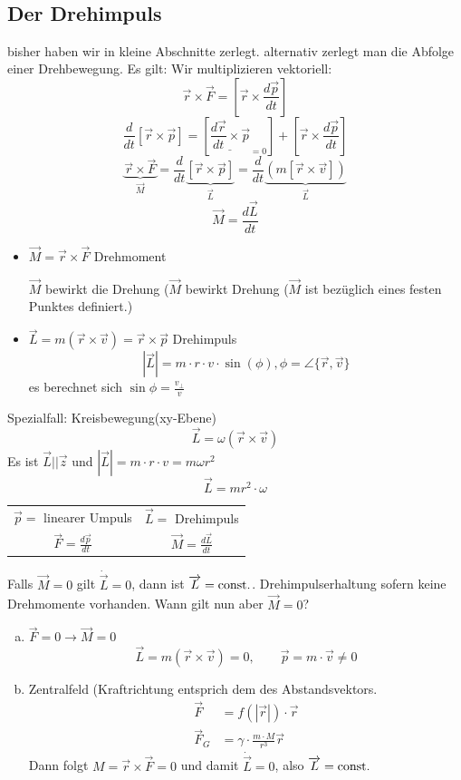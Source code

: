 \documentclass[a4paper,10pt]{scrartcl}
\begin{document}
\\
\subsection{Der Drehimpuls}
bisher haben wir in kleine Abschnitte zerlegt.
alternativ zerlegt man die Abfolge einer Drehbewegung. Es gilt:
Wir multiplizieren vektoriell:
\[
 \vec r \times \vec F=[\vec r \times \frac{d\vec p}{dt}]
\]
\[
 \frac{d}{dt}[\vec r \times \vec p]=[\underline{\frac{d\vec r}{dt} \times \vec p}_{=0}]+[\vec r \times \frac{d\vec p}{dt}]
\]
\[
 \underbrace{\vec r\times \vec F}_{\vec M}= \frac{d}{dt}\underbrace{[\vec r \times \vec p]}_{\vec L}=\frac{d}{dt}\underbrace{(m[\vec r \times \vec v])}_{\vec L}
\]
\[
 \boxed{\vec M= \frac{d\vec L}{dt}}
\]
\begin{itemize}
 \item $\vec M=\vec r \times \vec F$ Drehmoment
\begin{ex*}
$\vec M$ bewirkt die Drehung ($\vec M$ bewirkt Drehung ($\vec M$ ist bezüglich eines festen Punktes definiert.)  
\end{ex*}
\item $\vec L=m(\vec r \times \vec v)=\vec r \times \vec p$ Drehimpuls
\[
 |\vec L|=m\cdot r \cdot v \cdot \sin(\phi), \phi= \angle \{\vec r, \vec v\}
\]
es berechnet sich $\sin \phi=\frac{v_\perp}{v}$
\end{itemize}
\begin{seg}{Spezialfall: Kreisbewegung(xy-Ebene)}
\[
 \vec L = \omega (\vec r \times \vec v)
\]
Es ist $\vec L ||\vec z$ und $|\vec L|=m\cdot r \cdot v= m\omega r^2$
\[
 \boxed{\vec L=m r^2 \cdot \omega}
\]
 \begin{table}[h]
  \begin{tabular}{c|c}
 $\vec p=$ linearer Umpuls & $\vec L=$ Drehimpuls\\ 
 $\vec F= \frac{d\vec p}{dt}$ & $\vec M=\frac{d\vec L}{dt}$
  \end{tabular}
 \end{table}
Falls $\vec M=0$ gilt $\dot{\vec L}=0$, dann ist $\overrightarrow{L}=\text{const}.$. Drehimpulserhaltung sofern keine Drehmomente vorhanden. Wann gilt nun aber $\vec M=0$?

\end{seg}
\begin{enumerate}[a)]
 \item $\vec F=0 \to \vec M=0$\\
\[
 \vec L= m(\vec r \times \vec v)=0, \qquad \vec p =m\cdot \vec v \neq 0
\]
\item Zentralfeld (Kraftrichtung entsprich dem des Abstandsvektors.\\
\begin{align*}
 \vec F&= f(|\vec r|)\cdot \vec r\\
 \vec F_G&= \gamma \cdot \frac{m\cdot M}{r^3} \vec r
\end{align*}
Dann folgt $M=\vec r \times \vec F=0$ und damit $\dot{\vec L}=0$, also $\overrightarrow{L}=\text{const}.$
\end{enumerate}
\end{document}
